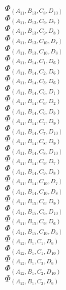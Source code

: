 \documentclass[14pt]{article}
\begin{document}
    $\Phi_{({A}_{11}, {B}_{13}, {C}_{8}, {D}_{10})}$ \\ 
    $\Phi_{({A}_{11}, {B}_{13}, {C}_{9}, {D}_{7})}$ \\ 
    $\Phi_{({A}_{11}, {B}_{13}, {C}_{9}, {D}_{8})}$ \\ 
    $\Phi_{({A}_{11}, {B}_{13}, {C}_{10}, {D}_{7})}$ \\ 
    $\Phi_{({A}_{11}, {B}_{13}, {C}_{10}, {D}_{8})}$ \\ 
    $\Phi_{({A}_{11}, {B}_{14}, {C}_{1}, {D}_{6})}$ \\ 
    $\Phi_{({A}_{11}, {B}_{14}, {C}_{2}, {D}_{6})}$ \\ 
    $\Phi_{({A}_{11}, {B}_{14}, {C}_{3}, {D}_{6})}$ \\ 
    $\Phi_{({A}_{11}, {B}_{14}, {C}_{6}, {D}_{1})}$ \\ 
    $\Phi_{({A}_{11}, {B}_{14}, {C}_{6}, {D}_{2})}$ \\ 
    $\Phi_{({A}_{11}, {B}_{14}, {C}_{6}, {D}_{3})}$ \\ 
    $\Phi_{({A}_{11}, {B}_{14}, {C}_{7}, {D}_{9})}$ \\ 
    $\Phi_{({A}_{11}, {B}_{14}, {C}_{7}, {D}_{10})}$ \\ 
    $\Phi_{({A}_{11}, {B}_{14}, {C}_{8}, {D}_{9})}$ \\ 
    $\Phi_{({A}_{11}, {B}_{14}, {C}_{8}, {D}_{10})}$ \\ 
    $\Phi_{({A}_{11}, {B}_{14}, {C}_{9}, {D}_{7})}$ \\ 
    $\Phi_{({A}_{11}, {B}_{14}, {C}_{9}, {D}_{8})}$ \\ 
    $\Phi_{({A}_{11}, {B}_{14}, {C}_{10}, {D}_{7})}$ \\ 
    $\Phi_{({A}_{11}, {B}_{14}, {C}_{10}, {D}_{8})}$ \\ 
    $\Phi_{({A}_{11}, {B}_{15}, {C}_{6}, {D}_{9})}$ \\ 
    $\Phi_{({A}_{11}, {B}_{15}, {C}_{6}, {D}_{10})}$ \\ 
    $\Phi_{({A}_{11}, {B}_{15}, {C}_{9}, {D}_{6})}$ \\ 
    $\Phi_{({A}_{11}, {B}_{15}, {C}_{10}, {D}_{6})}$ \\ 
    $\Phi_{({A}_{12}, {B}_{1}, {C}_{1}, {D}_{9})}$ \\ 
    $\Phi_{({A}_{12}, {B}_{1}, {C}_{1}, {D}_{10})}$ \\ 
    $\Phi_{({A}_{12}, {B}_{1}, {C}_{2}, {D}_{9})}$ \\ 
    $\Phi_{({A}_{12}, {B}_{1}, {C}_{2}, {D}_{10})}$ \\ 
    $\Phi_{({A}_{12}, {B}_{1}, {C}_{3}, {D}_{9})}$ \\ 
\end{document}
